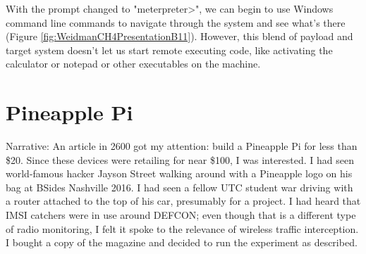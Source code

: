 With the prompt changed to "meterpreter\textgreater", we can begin to use Windows command line commands to navigate through the system and see what's there  (Figure \ref{fig:WeidmanCH4PresentationB11}).  However, this blend of payload and target system doesn't let us start remote executing code, like activating the calculator or notepad or other executables on the machine.

\section{Pineapple Pi}
Narrative:
An article in 2600 got my attention:  build a Pineapple Pi for less than \$20.  Since these devices were retailing for near \$100, I was interested.  I had seen world-famous hacker Jayson Street walking around with a Pineapple logo on his bag at BSides Nashville 2016.  I had seen a fellow UTC student war driving with a router attached to the top of his car, presumably for a project.  I had heard that IMSI catchers were in use around DEFCON; even though that is a different type of radio monitoring, I felt it spoke to the relevance of wireless traffic interception.  I bought a copy of the magazine and decided to run the experiment as described.

